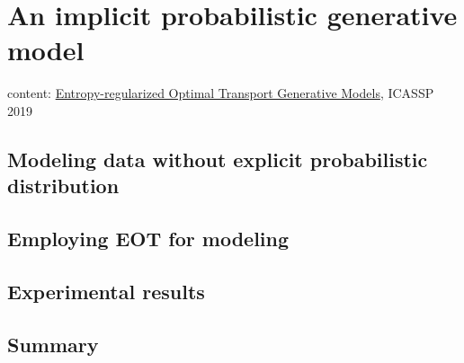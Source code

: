 \chapter{An implicit probabilistic generative model}
content: \href{https://ieeexplore.ieee.org/stamp/stamp.jsp?arnumber=8682721}{Entropy-regularized Optimal Transport Generative Models}, ICASSP 2019


\section{Modeling data without explicit probabilistic distribution}

\section{Employing EOT for modeling}

\section{Experimental results}

\section{Summary}

